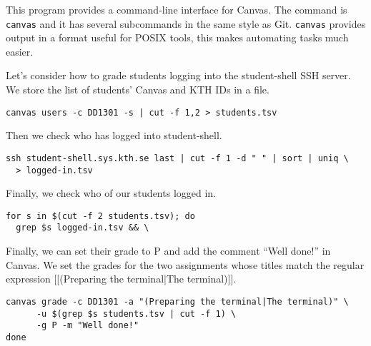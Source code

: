 
This program provides a command-line interface for Canvas.
The command is \texttt{canvas} and it has several subcommands in the same style 
as Git.
\texttt{canvas} provides output in a format useful for POSIX tools, this makes 
automating tasks much easier.

Let's consider how to grade students logging into the student-shell SSH server.
We store the list of students' Canvas and KTH IDs in a file.
\begin{lstlisting}
canvas users -c DD1301 -s | cut -f 1,2 > students.tsv
\end{lstlisting}
Then we check who has logged into student-shell.
\begin{lstlisting}[firstnumber=2]
ssh student-shell.sys.kth.se last | cut -f 1 -d " " | sort | uniq \
  > logged-in.tsv
\end{lstlisting}
Finally, we check who of our students logged in.
\begin{lstlisting}[firstnumber=4]
for s in $(cut -f 2 students.tsv); do
  grep $s logged-in.tsv && \
\end{lstlisting}
Finally, we can set their grade to P and add the comment \enquote{Well done!} 
in Canvas.
We set the grades for the two assignments whose titles match the regular 
expression [[(Preparing the terminal|The terminal)]].
\begin{lstlisting}[firstnumber=6]
    canvas grade -c DD1301 -a "(Preparing the terminal|The terminal)" \
      -u $(grep $s students.tsv | cut -f 1) \
      -g P -m "Well done!"
done
\end{lstlisting}


